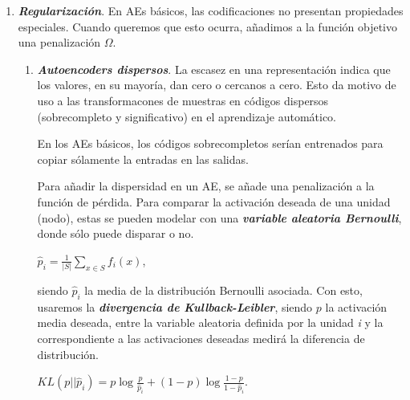 \begin{enumerate}
\begin{enumerate}
\begin{enumerate}
        \end{enumerate}
        
        \item \textit{\textbf{Regularización}}. En AEs básicos, las codificaciones no presentan propiedades especiales. Cuando queremos que esto ocurra, añadimos a la función objetivo una penalización $\Omega$.
            
            
            \begin{enumerate}
                \item \textit{\textbf{Autoencoders dispersos}}. La escasez en una representación indica que los valores, en su mayoría, dan cero o cercanos a cero. Esto da motivo de uso a las transformacones de muestras en códigos dispersos (sobrecompleto y significativo) en el aprendizaje automático. 
                
                En los AEs básicos, los códigos sobrecompletos serían entrenados para copiar sólamente la entradas en las salidas.
                
                Para añadir la dispersidad en un AE, se añade una penalización a la función de pérdida. Para comparar la activación deseada de una unidad (nodo), estas se pueden modelar con una  \textit{\textbf{variable aleatoria Bernoulli}}, donde sólo puede disparar o no.
                
                \begin{center}
                $\hat{p}_{i} = \frac{1}{|S|} \sum_{x \in S} f_{i}(x)$,
                \end{center}
                
                siendo $\hat{p}_{i}$ la media de la distribución Bernoulli asociada. Con esto, usaremos la \textit{\textbf{divergencia de Kullback-Leibler}}, siendo $p$ la activación media deseada, entre la variable aleatoria definida por la unidad \textit{i} y la correspondiente a las activaciones deseadas medirá la diferencia de distribución.
                
                \begin{center}
                $KL(p||\hat{p}_{i}) = p \log\frac{p}{\hat{p}_{i}} + (1 - p) \log\frac{1 - p}{1 - \hat{p}_{i}}$.
                \end{center}
                \newpage
                

\end{enumerate}
\end{enumerate}
\end{enumerate}
